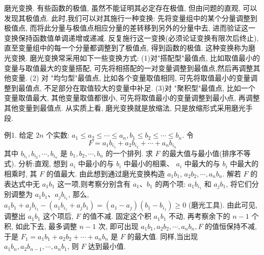
磨光变换.
有些函数的极值, 虽然不能证明其必定存在极值, 但由问题的直观, 可以发现其极值点.
此时,我们可以对其施行一种变换: 先将变量组中的某个分量调整到极值点, 而将此分量与极值点相应分量的差转移到另外的分量中去, 进而验证这一变换保持函数值单调递增或递减.
反复施行这一变换(必须论证变换有限次后终止), 直至变量组中的每一个分量都调整到了极值点, 得到函数的极值.
这种变换称为磨光变换.
磨光变换常采用如下一些变换方式:
(1)对"搭配型"最值点, 比如取值最小的变量与取值最大的变量搭配, 可先将相搭配的一对变量调整到最值点,然后再调整其他变量.
(2) 对 "均匀型"最值点, 比如各个变量取值相同, 可先将取值最小的变量调整到最值点, 不足部分在取值较大的变量中补足.
(3)对 "聚积型"最值点, 比如一个变量取值最大, 其他变量取值都很小, 可先将取值最小的变量调整到最小点, 再调整其他变量到最值点.
从实质上看, 磨光变换就是放缩法, 只是放缩形式采用磨光手段.



例1. 给定 $2 n$ 个实数: $a_1 \leqslant a_2 \leqslant \cdots \leqslant a_n, b_1 \leqslant b_2 \leqslant \cdots \leqslant b_n$. 令
$$
F=a_1 b_{i_1}+a_2 b_{i_2}+\cdots+a_n b_{i_n}
$$
其中 $b_{i_1}, b_{i_2}, \cdots, b_{i_n}$ 是 $b_1, b_2, \cdots, b_n$ 的一个排列.
求 $F$ 的最大值与最小值(排序不等式).
分析:直观, 想到 $a_i$ 中最小的与 $b_i$ 中最小的相乘、 $a_i$ 中最大的与 $b_i$ 中最大的相乘时, 其 $F$ 的值最大.
由此想到通过磨光变换构造 $a_1 b_1$, $a_2 b_2, \cdots, a_n b_n$.
解若 $F$ 的表达式中无 $a_1 b_1$ 这一项,则考察分别含有 $a_1 、 b_1$ 的两个项: $a_1 b_{i_1}$ 和 $a_j b_1$, 将它们分别调整为 $a_1 b_1 、 a_j b_{i_1}$, 那么,
$a_1 b_1+a_j b_{i_1}-\left(a_1 b_{i_1}+a_j b_1\right)=\left(a_1-a_j\right)\left(b_1-b_{i_1}\right) \geqslant 0$ (磨光工具).
由此可见,调整出 $a_1 b_1$ 这个项后, $F$ 的值不减.
固定这个积 $a_1 b_1$ 不动, 再考察余下的 $n-1$ 个积, 如此下去, 最多调整 $n-1$ 次, 即可出现 $a_1 b_1, a_2 b_2, \cdots, a_n b_n, F$ 的值恒保持不减, 于是 $F_1=a_1 b_1+ a_2 b_2+\cdots+a_n b_n$ 是 $F$ 的最大值.
同样,当出现 $a_1 b_n, a_2 b_{n-1}, \cdots, a_n b_1$, 则 $F$ 达到最小值.



